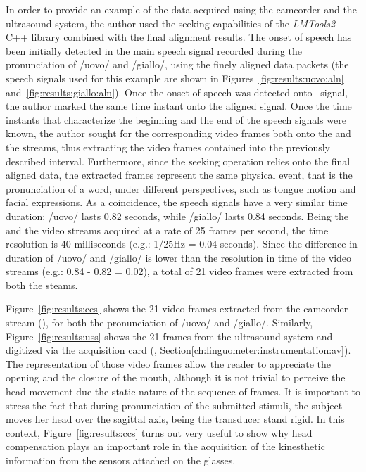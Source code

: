 

In order to provide an example of the data acquired using the camcorder and the
ultrasound system, the author used the seeking capabilities of the 
\emph{LMTools2} C++ library combined with the final alignment results.
The onset of speech has been initially detected in the  main 
speech signal recorded during the pronunciation of /uovo/ and /giallo/, using
the finely aligned data packets (the speech signals used for this example are
shown in Figures~\ref{fig:results:uovo:aln} and~\ref{fig:results:giallo:aln}).
Once the onset of speech was detected onto~ signal, the author
marked the same time instant onto the aligned  signal.
Once the time instants that characterize the beginning and the end of the
speech signals were known, the author sought for the corresponding video
frames both onto the  and the  streams, thus
extracting  the video frames contained into the previously described interval.
Furthermore, since the seeking operation relies onto the final aligned data,
the extracted frames represent the same physical event, that is the
pronunciation of a word, under different perspectives, such as tongue motion and
facial expressions.
As a coincidence, the speech signals have a very similar time duration: /uovo/
lasts 0.82 seconds, while /giallo/ lasts 0.84 seconds.
Being the  and the  video streams acquired at a rate 
of 25 frames per second, the time resolution is 40 milliseconds (e.g.: 1/25Hz =
0.04 seconds).
Since the difference in duration of /uovo/ and /giallo/ is lower than the 
resolution in time of the video streams (e.g.: 0.84 - 0.82 = 0.02), a
total of 21 video frames were extracted from both the steams.

Figure~\ref{fig:results:ccs} shows the 21
video frames extracted from the camcorder stream (), for both the
pronunciation of /uovo/ and /giallo/.
Similarly, Figure~\ref{fig:results:uss}
shows the 21 frames from the ultrasound system and digitized via the acquisition
card (, Section\ref{ch:linguometer:instrumentation:av}).
The representation of those video frames allow the reader to appreciate the
opening and the closure of the mouth, although it is not trivial to perceive
the head movement due the static nature of the sequence of frames.
It is important to stress the fact that during pronunciation of the submitted
stimuli, the subject moves her head over the sagittal axis, being the transducer
stand rigid. 
In this context, Figure~\ref{fig:results:ccs} turns out very useful to show 
why head compensation plays an important role in the acquisition of the 
kinesthetic information from the sensors attached on the glasses.




